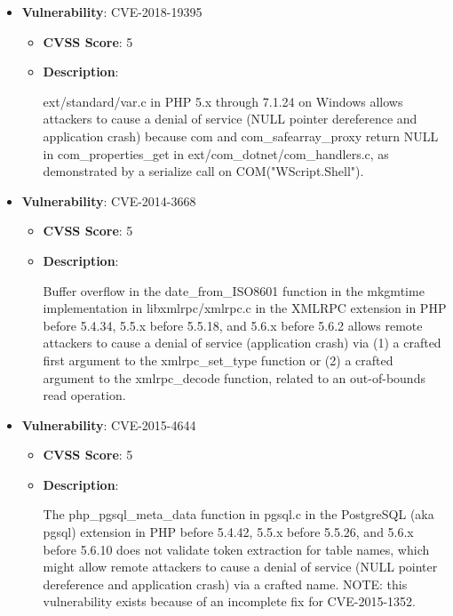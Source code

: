 \documentclass{article}
\begin{document}
\begin{itemize}
        \item \textbf{Vulnerability}: CVE-2018-19395
        \begin{itemize}
            \item \textbf{CVSS Score}:  5 
            \item \textbf{Description}:
            \parbox[t]{0.9\linewidth}{
                \ttfamily ext/standard/var.c in PHP 5.x through 7.1.24 on Windows allows attackers to cause a denial of service (NULL pointer dereference and application crash) because com and com\_safearray\_proxy return NULL in com\_properties\_get in ext/com\_dotnet/com\_handlers.c, as demonstrated by a serialize call on COM("WScript.Shell").
            }
        \end{itemize}
    
        \item \textbf{Vulnerability}: CVE-2014-3668
        \begin{itemize}
            \item \textbf{CVSS Score}:  5 
            \item \textbf{Description}:
            \parbox[t]{0.9\linewidth}{
                \ttfamily Buffer overflow in the date\_from\_ISO8601 function in the mkgmtime implementation in libxmlrpc/xmlrpc.c in the XMLRPC extension in PHP before 5.4.34, 5.5.x before 5.5.18, and 5.6.x before 5.6.2 allows remote attackers to cause a denial of service (application crash) via (1) a crafted first argument to the xmlrpc\_set\_type function or (2) a crafted argument to the xmlrpc\_decode function, related to an out-of-bounds read operation.
            }
        \end{itemize}
    
        \item \textbf{Vulnerability}: CVE-2015-4644
        \begin{itemize}
            \item \textbf{CVSS Score}:  5 
            \item \textbf{Description}:
            \parbox[t]{0.9\linewidth}{
                \ttfamily The php\_pgsql\_meta\_data function in pgsql.c in the PostgreSQL (aka pgsql) extension in PHP before 5.4.42, 5.5.x before 5.5.26, and 5.6.x before 5.6.10 does not validate token extraction for table names, which might allow remote attackers to cause a denial of service (NULL pointer dereference and application crash) via a crafted name.  NOTE: this vulnerability exists because of an incomplete fix for CVE-2015-1352.
            }
        \end{itemize}
    

\end{itemize}
\end{document}
